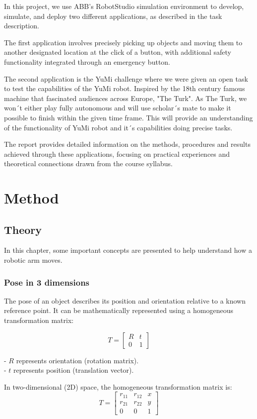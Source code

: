 \documentclass[a4paper,12pt]{article}
\begin{document}
In this project, we use ABB's RobotStudio simulation environment to develop, simulate, and deploy two different applications, as described in the task description. 

The first application involves precisely picking up objects and moving them to another designated location at the click of a button, with additional safety functionality integrated through an emergency button.

The second application is the YuMi challenge where we were given an open task to test the capabilities of the YuMi robot. Inspired by the 18th century famous machine that fascinated audiences across Europe, "The Turk". As The Turk, we won´t either play fully autonomous and will use scholar´s mate to make it possible to finish within the given time frame. This  will provide an understanding of the functionality of YuMi robot and it´s capabilities doing precise tasks.

The report provides detailed information on the methods, procedures and results achieved through these applications, focusing on practical experiences and theoretical connections drawn from the course syllabus.

\section{Method}
\subsection{Theory}
In this chapter, some important concepts are presented to help understand how a robotic arm moves.

\subsubsection{Pose in 3 dimensions}
The pose of an object describes its position and orientation relative to a known reference point. It can be mathematically represented using a homogeneous transformation matrix:

\[
T = 
\begin{bmatrix}
R & t \\
0 & 1
\end{bmatrix}
\]

- \( R \) represents orientation (rotation matrix).
\\
- \( t \) represents position (translation vector).

In two-dimensional (2D) space, the homogeneous transformation matrix is:
\[
T =
\begin{bmatrix}
r_{11} & r_{12} & x \\
r_{21} & r_{22} & y \\
0 & 0 & 1
\end{bmatrix}
\]
\end{document}
